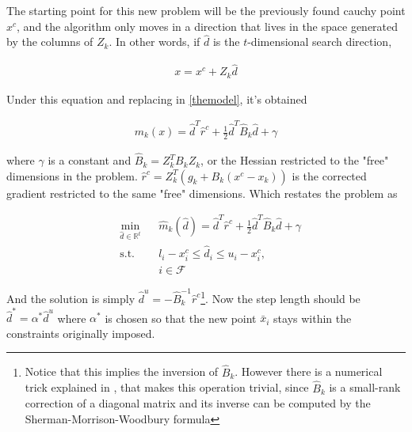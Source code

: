 The starting point for this new problem will be the previously found cauchy point $x^c$, and the algorithm only moves in a direction that lives in the space generated by the columns of $Z_k$. In other words, if $\hat{d}$ is the $t$-dimensional search direction,  

\begin{equation} \label{dirconst}
  \begin{aligned}
    x = x^c + Z_k \hat{d}
  \end{aligned}
\end{equation}

Under this equation and replacing in \ref{themodel}, it's obtained

\begin{equation} \label{themodelrestr}
  \begin{aligned}
    m_k(x) = \hat{d}^T\hat{r}^c + \frac{1}{2} \hat{d}^T \hat{B}_k \hat{d} + \gamma
  \end{aligned}
\end{equation}

where $\gamma$ is a constant and $\hat{B}_k = Z_k^T B_k Z_k$, or the Hessian restricted to the "free" dimensions in the problem. $\hat{r}^c = Z^T_k (g_k + B_k(x^c - x_k))$ is the corrected gradient restricted to the same "free" dimensions. Which restates the problem as

\begin{equation} \label{subproblem}
  \begin{aligned}
    & \underset{\hat{d} \in \mathbb{R}^t}{\text{min}} 
    & & \hat{m}_k(\hat{d}) = \hat{d}^T\hat{r}^c + \frac{1}{2} \hat{d}^T\hat{B}_k\hat{d} + \gamma \\
    & \text{s.t.}
    & & l_i - x_i^c \leq \hat{d}_i \leq u_i - x_i^c , \; \\
    & & & i \in \mathcal{F}
  \end{aligned}
\end{equation}

And the solution is simply $\hat{d}^u = -\hat{B}_k^{-1}\hat{r}^c$\footnote{Notice that this implies the inversion of $\hat{B}_k$. However there is a numerical trick explained in \citep{nocedal}, that makes this operation trivial, since $\hat{B}_k$ is a small-rank correction of a diagonal matrix and its inverse can be computed by the Sherman-Morrison-Woodbury formula}. Now the step length should be $\hat{d}^* = \alpha^* \hat{d}^u$ where $\alpha^*$ is chosen so that the new point $\bar{x}_i$ stays within the constraints originally imposed.

